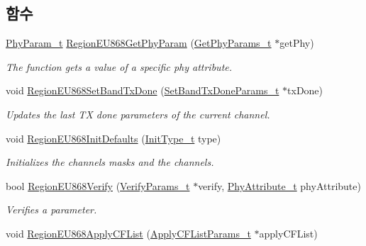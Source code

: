 \subsection*{함수}
\begin{DoxyCompactItemize}
\item 
\mbox{\hyperlink{group___r_e_g_i_o_n_gaed159b26e5c4677236b6e8677019db30}{Phy\+Param\+\_\+t}} \mbox{\hyperlink{group___r_e_g_i_o_n_e_u868_ga4150dec3b05b9774aedf4e2e32499fd3}{Region\+E\+U868\+Get\+Phy\+Param}} (\mbox{\hyperlink{group___r_e_g_i_o_n_gab471483fff904f4f89bbc03f7fc380ab}{Get\+Phy\+Params\+\_\+t}} $\ast$get\+Phy)
\begin{DoxyCompactList}\small\item\em The function gets a value of a specific phy attribute. \end{DoxyCompactList}\item 
void \mbox{\hyperlink{group___r_e_g_i_o_n_e_u868_ga5cf25bd6be48790f3f637d60a236fdb1}{Region\+E\+U868\+Set\+Band\+Tx\+Done}} (\mbox{\hyperlink{group___r_e_g_i_o_n_gad0524aa0673c0814a71e7a4f9cade3fc}{Set\+Band\+Tx\+Done\+Params\+\_\+t}} $\ast$tx\+Done)
\begin{DoxyCompactList}\small\item\em Updates the last TX done parameters of the current channel. \end{DoxyCompactList}\item 
void \mbox{\hyperlink{group___r_e_g_i_o_n_e_u868_ga3e8ada4579aff33ad74ca34513d64893}{Region\+E\+U868\+Init\+Defaults}} (\mbox{\hyperlink{group___r_e_g_i_o_n_gaddc73ae10673ec925724e7870363bda9}{Init\+Type\+\_\+t}} type)
\begin{DoxyCompactList}\small\item\em Initializes the channels masks and the channels. \end{DoxyCompactList}\item 
bool \mbox{\hyperlink{group___r_e_g_i_o_n_e_u868_ga66189a5f3ba138e24f8033d55e9b72a7}{Region\+E\+U868\+Verify}} (\mbox{\hyperlink{group___r_e_g_i_o_n_ga966d97bc2f25df1c09e92e60ef652276}{Verify\+Params\+\_\+t}} $\ast$verify, \mbox{\hyperlink{group___r_e_g_i_o_n_ga9445b07fdf77581ecfaf389970e635f8}{Phy\+Attribute\+\_\+t}} phy\+Attribute)
\begin{DoxyCompactList}\small\item\em Verifies a parameter. \end{DoxyCompactList}\item 
void \mbox{\hyperlink{group___r_e_g_i_o_n_e_u868_ga87e838c747c248c577a44329c0013988}{Region\+E\+U868\+Apply\+C\+F\+List}} (\mbox{\hyperlink{group___r_e_g_i_o_n_ga71588e9ad07e34b78fa91d51881fd3c6}{Apply\+C\+F\+List\+Params\+\_\+t}} $\ast$apply\+C\+F\+List)

\end{DoxyCompactItemize}
